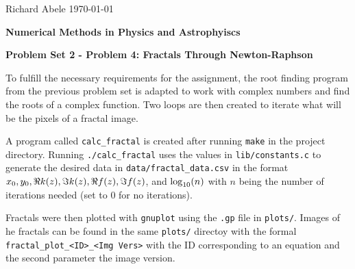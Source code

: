 \documentclass[12pt]{article}
\DeclarePairedDelimiter\rb{(}{)}
\begin{document}
\noindent Richard Abele \hfill \today \\[30pt]
\centerline{ \Large{ \textbf{ Numerical Methods in Physics and Astrophyiscs }}}
\centerline{ \Large{ \textbf{ Problem Set 2 - Problem 4: Fractals Through Newton-Raphson }}}

To fulfill the necessary requirements for the assignment, the root finding program from the previous problem set is adapted to work with complex numbers and find the roots of a complex function. Two loops are then created to iterate what will be the pixels of a fractal image. 

A program called \texttt{calc_fractal} is created after running \texttt{make} in the project directory. Running \texttt{./calc_fractal} uses the values in \texttt{lib/constants.c} to generate the desired data in \texttt{data/fractal_data.csv} in the format \(x_{0},y_{0},  \Re k\rb*{z}, \Im k \rb*{z}, \Re f \rb*{z}, \Im f \rb*{z}\), and \(\log_{10}\rb*{n}\) with \(n\) being the number of iterations needed (set to 0 for no iterations). 

Fractals were then plotted with \texttt{gnuplot} using the \texttt{.gp} file in \texttt{plots/}. Images of he fractals can be found in the same \texttt{plots/} directoy with the formal \texttt{fractal_plot_<ID>_<Img Vers>} with the ID corresponding to an equation and the second parameter the image version. 
\end{document}
